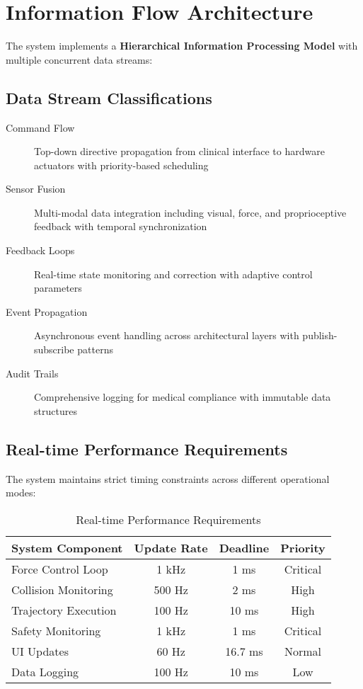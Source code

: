 \section{Information Flow Architecture}
\label{sec:information_flow}

The \rus{} system implements a \textbf{Hierarchical Information Processing Model} with multiple concurrent data streams:

\subsection{Data Stream Classifications}

\begin{description}
    \item[Command Flow] Top-down directive propagation from clinical interface to hardware actuators with priority-based scheduling
    
    \item[Sensor Fusion] Multi-modal data integration including visual, force, and proprioceptive feedback with temporal synchronization
    
    \item[Feedback Loops] Real-time state monitoring and correction with adaptive control parameters
    
    \item[Event Propagation] Asynchronous event handling across architectural layers with publish-subscribe patterns
    
    \item[Audit Trails] Comprehensive logging for medical compliance with immutable data structures
\end{description}

\subsection{Real-time Performance Requirements}

The system maintains strict timing constraints across different operational modes:

\begin{table}[H]
\centering
\caption{Real-time Performance Requirements}
\label{tab:timing_requirements}
\begin{tabular}{@{}lccc@{}}
\toprule
\textbf{System Component} & \textbf{Update Rate} & \textbf{Deadline} & \textbf{Priority} \\
\midrule
Force Control Loop & 1 kHz & 1 ms & Critical \\
Collision Monitoring & 500 Hz & 2 ms & High \\
Trajectory Execution & 100 Hz & 10 ms & High \\
Safety Monitoring & 1 kHz & 1 ms & Critical \\
UI Updates & 60 Hz & 16.7 ms & Normal \\
Data Logging & 100 Hz & 10 ms & Low \\
\bottomrule
\end{tabular}
\end{table}

